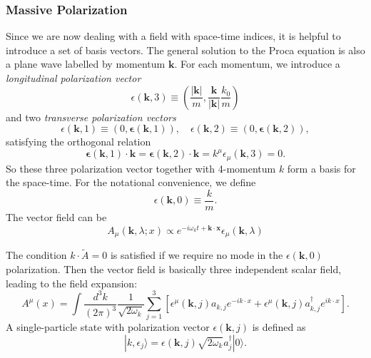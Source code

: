 \subsubsection{Massive Polarization}
Since we are now dealing with a field with space-time indices, it is helpful to introduce a set of basis vectors.
The general solution to the Proca equation is also a plane wave labelled by momentum $\bm k$.
For each momentum, we introduce a \textit{longitudinal polarization vector}
\begin{equation}
	\epsilon(\bm k,3) \equiv \left(\frac{|\bm k|}{m}, \frac{\bm k}{|\bm k|}\frac{k_0}{m} \right)
\end{equation}
and two \textit{transverse polarization vectors}
\begin{equation}
	\epsilon(\bm k, 1) \equiv (0, \bm \epsilon(\bm k, 1)), \quad
	\epsilon(\bm k, 2) \equiv (0, \bm \epsilon(\bm k, 2)),
\end{equation}
satisfying the orthogonal relation
\begin{equation}
	\bm \epsilon(\bm k, 1)\cdot \bm k = \bm \epsilon(\bm k, 2)\cdot \bm k = k^\mu \epsilon_\mu(\bm k, 3) = 0.
\end{equation}
So these three polarization vector together with 4-momentum $k$ form a basis for the space-time.
For the notational convenience, we define
\begin{equation}
	\epsilon(\bm k,0) \equiv \frac{k}{m}.
\end{equation}
The vector field can be 
\begin{equation}
	A_\mu(\bm k, \lambda; x) \propto e^{-i\omega_k t + \bm k \cdot \bm x} \epsilon_\mu(\bm k, \lambda)
\end{equation}

The condition $k \cdot \tilde A = 0$ is satisfied if we require no mode in the $\epsilon(\bm k, 0)$ polarization.
Then the vector field is basically three independent scalar field, leading to the  field expansion:
\begin{equation}
	A^\mu(x) = \int \frac{d^{3} k}{(2\pi)^{3}}\frac{1}{\sqrt{2\omega_k}}
	\sum_{j=1}^3 \left[\epsilon^\mu(\bm k, j) a_{k,j} e^{-ik\cdot x} + 
	\epsilon^{\mu}(\bm k, j) a^\dagger_{k,j} e^{ik\cdot x}\right].
\end{equation}
A single-particle state with polarization vector $\epsilon(\bm k, j)$ is defined as
\begin{equation}
	|k,\epsilon_j\rangle = \epsilon(\bm k, j) \sqrt{2\omega_k} a^\dagger_{j}|0\rangle.
\end{equation}


